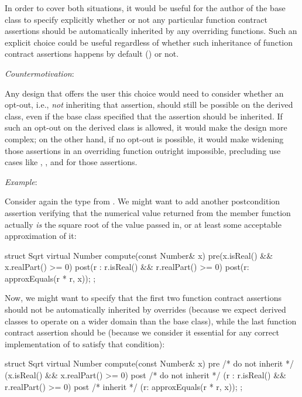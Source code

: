 In order to cover both situations, it would be useful for the author of the base class to specify explicitly whether or not any particular function contract assertions should be automatically inherited by any overriding functions. Such an explicit choice could be useful regardless of whether such inheritance of function contract assertions happens by default () or not.

\emph{Countermotivation}:

Any design that offers the user this choice would need to consider whether an opt-out, i.e., \emph{not} inheriting that assertion, should still be possible on the derived class, even if the base class specified that the assertion should be inherited. If such an opt-out on the derived class is allowed, it would make the design more complex; on the other hand, if no opt-out is possible, it would make widening those assertions in an overriding function outright impossible, precluding use cases like , , and  for those assertions.

\emph{Example}:

Consider again the  type from . We might want to add another postcondition assertion verifying that the numerical value returned from the  member function actually \emph{is} the square root of the value passed in, or at least some acceptable approximation of it:

\begin{codeblock}
struct Sqrt {
  virtual Number compute(const Number& x)
    pre(x.isReal() && x.realPart() >= 0)
    post(r : r.isReal() && r.realPart() >= 0)
    post(r: approxEquals(r * r, x));
};
\end{codeblock}

Now, we might want to specify that the first two function contract assertions should not be automatically inherited by  overrides (because we expect derived classes to operate on a wider domain than the base class), while the last function contract assertion should be (because we consider it essential for any correct implementation of  to satisfy that condition):

\begin{codeblock}
struct Sqrt {
  virtual Number compute(const Number& x)
    pre /* do not inherit */  (x.isReal() && x.realPart() >= 0)
    post /* do not inherit */ (r : r.isReal() && r.realPart() >= 0)
    post /* inherit */       (r: approxEquals(r * r, x));
};
\end{codeblock}

